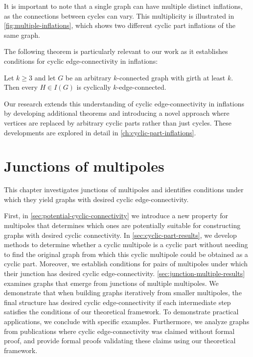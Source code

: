 \documentclass[12pt, twoside]{book}
\begin{document}
It is important to note that a single graph can have multiple distinct inflations, as the connections between cycles can vary. This multiplicity is illustrated in \cref{fig:multiple-inflations}, which shows two different cyclic part inflations of the same graph.

The following theorem is particularly relevant to our work as it establishes conditions for cyclic edge-connectivity in inflations:

\begin{theorem}\label{th:inflations-cyclic-connectivity}
	Let $k \geq 3$ and let $G$ be an arbitrary $k$-connected graph with girth at least $k$. Then every $H \in I(G)$ is cyclically $k$-edge-connected.
\end{theorem}

Our research extends this understanding of cyclic edge-connectivity in inflations by developing additional theorems and introducing a novel approach where vertices are replaced by arbitrary cyclic parts rather than just cycles. These developments are explored in detail in \cref{ch:cyclic-part-inflations}.

\chapter{Junctions of multipoles}\label{ch:junctions-of-multipoles}

This chapter investigates junctions of multipoles and identifies conditions under which they yield graphs with desired cyclic edge-connectivity.

First, in \cref{sec:potential-cyclic-connectivity} we introduce a new property for multipoles that determines which ones are potentially suitable for constructing graphs with desired cyclic connectivity. In \cref{sec:cyclic-part-results}, we develop methods to determine whether a cyclic multipole is a cyclic part without needing to find the original graph from which this cyclic multipole could be obtained as a cyclic part. Moreover, we establish conditions for pairs of multipoles under which their junction has desired cyclic edge-connectivity. \cref{sec:junction-multiple-results} examines graphs that emerge from junctions of multiple multipoles. We demonstrate that when building graphs iteratively from smaller multipoles, the final structure has desired cyclic edge-connectivity if each intermediate step satisfies the conditions of our theoretical framework. To demonstrate practical applications, we conclude with specific examples. Furthermore, we analyze graphs from publications \cite{Kochol1996, Macajova2006} where cyclic edge-connectivity was claimed without formal proof, and provide formal proofs validating these claims using our theoretical framework.
\end{document}
